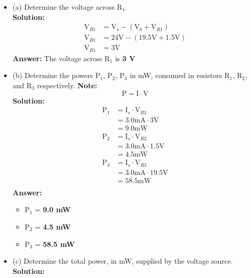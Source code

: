 \documentclass{article}
\begin{document}
\begin{itemize}
	\item (a) Determine the voltage across $\text{R}_1$. \\
		\textbf{Solution:} \\
		\begin{align*}
			\text{V}_{R1} &= \text{V}_s - (\text{V}_b + \text{V}_{R1}) \\
			\text{V}_{R1} &= 24 \text{V} - (19.5 \text{V} + 1.5 \text{V}) \\
			\text{V}_{R1} &= 3 \text{V}
		\end{align*}
		\textbf{Answer:} The voltage across $\text{R}_1$ is \textbf{3 V}
	\item (b) Determine the powers $\text{P}_1$, $\text{P}_2$, $\text{P}_3$ in mW, consumed in resistors $\text{R}_1$, $\text{R}_2$, and $\text{R}_3$ respectively.
		\textbf{Note:} \\
		\begin{equation}
			\text{P} = \text{I} \cdot \text{V}
		\end{equation}
		\textbf{Solution:} \\
		\begin{align*}
			\text{P}_1 &= \text{I}_s \cdot \text{V}_{R1} \\
				&= 3.0 \text{mA} \cdot 3 \text{V} \\
				&= 9.0 \text{mW} \\
			\text{P}_2 &= \text{I}_s \cdot \text{V}_{R2} \\
				&= 3.0 \text{mA} \cdot 1.5 \text{V} \\
				&= 4.5 \text{mW} \\
			\text{P}_3 &= \text{I}_s \cdot \text{V}_{R3} \\
				&= 3.0 \text{mA} \cdot 19.5 \text{V} \\
				&= 58.5 \text{mW} \\
		\end{align*}
		\textbf{Answer:}
		\begin{itemize}
			\item $\text{P}_1$ = \textbf{9.0 mW}
			\item $\text{P}_2$ = \textbf{4.5 mW}
			\item $\text{P}_3$ = \textbf{58.5 mW}
		\end{itemize}
	\item (c) Determine the total power, in mW, supplied by the voltage source. \\
		\textbf{Solution:} \\
		\begin{align*}

\end{align*}
\end{itemize}
\end{document}
